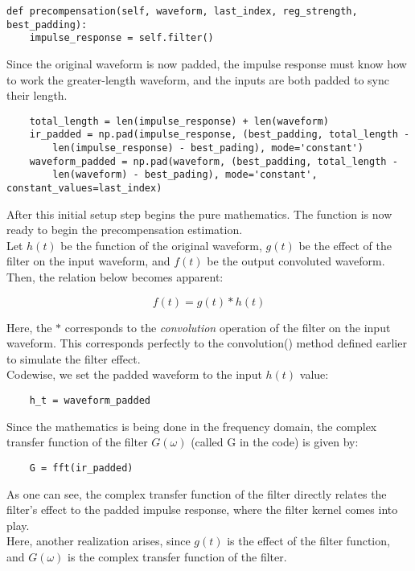 \begin{verbatim}
def precompensation(self, waveform, last_index, reg_strength, best_padding):
    impulse_response = self.filter()
\end{verbatim}

Since the original waveform is now padded, the impulse response must know how to work the greater-length waveform, and the inputs are both padded to sync their length. 

\begin{verbatim}
    total_length = len(impulse_response) + len(waveform)
    ir_padded = np.pad(impulse_response, (best_padding, total_length - 
        len(impulse_response) - best_pading), mode='constant')
    waveform_padded = np.pad(waveform, (best_padding, total_length - 
        len(waveform) - best_pading), mode='constant', constant_values=last_index)
\end{verbatim}

After this initial setup step begins the pure mathematics. The function is now ready to begin the precompensation estimation.
\\
Let $h(t)$ be the function of the original waveform, $g(t)$ be the effect of the filter on the input waveform, and $f(t)$ be the output convoluted waveform. Then, the relation below becomes apparent:

\begin{equation}
    f(t) = g(t) * h(t)
\end{equation}

Here, the $*$ corresponds to the \textit{convolution} operation of the filter on the input waveform. This corresponds perfectly to the convolution() method defined earlier to simulate the filter effect.
\\
Codewise, we set the padded waveform to the input $h(t)$ value:

\begin{verbatim}
    h_t = waveform_padded
\end{verbatim}

Since the mathematics is being done in the frequency domain, the complex transfer function of the filter $G(\omega)$ (called G in the code) is given by: 

\begin{verbatim}
    G = fft(ir_padded)
\end{verbatim}

As one can see, the complex transfer function of the filter directly relates the filter's effect to the padded impulse response, where the filter kernel comes into play. 
\\
Here, another realization arises, since $g(t)$ is the effect of the filter function, and $G(\omega)$ is the complex transfer function of the filter.

